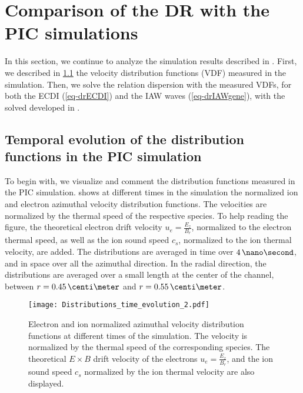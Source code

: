 \FloatBarrier
\section{Comparison of the \acs{DR} with the \acs{PIC} simulations}
  \label{sec-DR-results}
  
  In this section, we continue to analyze the simulation results described in .
  First, we described in \cref{subsec-VDFpic} the velocity distribution functions (VDF) measured in the simulation.
  Then, we solve the relation dispersion with the measured VDFs, for both the \ac{ECDI} (\cref{eq-drECDI}) and the \ac{IAW} waves (\cref{eq-drIAWgene}), with the solved developed in .

  \subsection{Temporal evolution of the distribution functions in the \acs{PIC} simulation} \label{subsec-VDFpic}
  
  To begin with, we visualize and comment the distribution functions measured in the \ac{PIC} simulation.
   shows at different times in the simulation the normalized ion and electron azimuthal velocity distribution functions.
  The velocities are normalized by the thermal speed of the respective species.
  To help reading the figure, the  theoretical electron drift velocity $u_e = \frac{E_z}{B_r}$, normalized to the electron thermal speed, as well as the ion sound speed $c_s$, normalized to the ion thermal velocity, are added.
  The distributions are averaged in time over $4\,\nano\second$, and in space over all the azimuthal direction.
  In the radial direction, the distributions are averaged over a small length at the center of the channel, between $r=0.45\,\centi\meter$ and $r=0.55\,\centi\meter$.
  
  \begin{figure}[!hbt]
    \centering
    \texttt{[image: Distributions\_time\_evolution\_2.pdf]}
    \caption{Electron and ion normalized azimuthal velocity distribution functions at different times of the simulation. The velocity is normalized by the thermal speed of the corresponding species. The theoretical $E\times B$ drift velocity of the electrons $u_e = \frac{E_z}{B_r}$, and the ion sound speed $c_s$ normalized by the ion thermal velocity are also displayed.}
    \label{fig-vdfs_pic_time}
  \end{figure}
  
